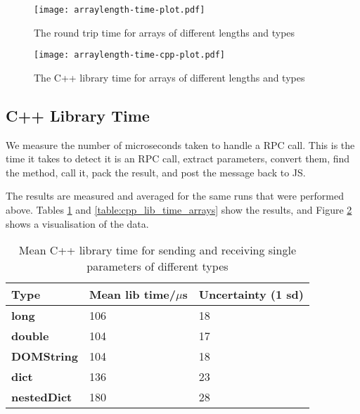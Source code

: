 \begin{figure}
    \centering
    \texttt{[image: arraylength-time-plot.pdf]} 
    \caption{The round trip time for arrays of different lengths and types}
    \label{fig:arraylength-time-plot}
\end{figure}


\begin{figure}
    \centering
    \texttt{[image: arraylength-time-cpp-plot.pdf]} 
    \caption{The C++ library time for arrays of different lengths and types}
    \label{fig:arraylength-time-cpp-plot}
\end{figure}



\subsection{C++ Library Time}\label{c-library-time}

We measure the number of microseconds taken to handle a RPC call. This is the time it takes to detect it is an RPC call, extract parameters, convert them, find the method, call it, pack the result, and post the message back to JS.

The results are measured and averaged for the same runs that were performed above. Tables \ref{table:cpp_lib_time_single_param} and \ref{table:cpp_lib_time_arrays} show the results, and Figure \ref{fig:arraylength-time-cpp-plot} shows a visualisation of the data.


\begin{table}[h]
\centering
\begin{tabular}{l|ll}
\textbf{Type}       & \textbf{Mean lib time/$\mu$s} & \textbf{Uncertainty (1 sd)} \\ \hline
\textbf{long}       & 106                       & 18                          \\
\textbf{double}     & 104                       & 17                          \\
\textbf{DOMString}  & 104                       & 18                          \\
\textbf{dict}       & 136                       & 23                          \\
\textbf{nestedDict} & 180                       & 28                         
\end{tabular}
\caption{Mean C++ library time for sending and receiving single parameters of different types}
\label{table:cpp_lib_time_single_param}
\end{table}


